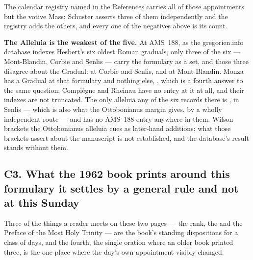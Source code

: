 The calendar registry named in the References carries all of those
appointments but the votive Mass; Schuster asserts three of them independently
and the registry adds the others, and every one of the negatives above is its
count.

\textbf{The Alleluia is the weakest of the five.} At AMS~188, as the
gregorien.info database indexes Hesbert's six oldest Roman graduals, only three
of the six --- Mont-Blandin, Corbie and Senlis --- carry the formulary as a set,
and those three disagree about the Gradual:  at Corbie and
Senlis,  and  at
Mont-Blandin. Monza has a Gradual at that formulary and nothing else,
, which is a fourth answer to the same question;
Compiègne and Rheinau have no entry at it at all, and their indexes are not
truncated. The only alleluia any of the six records there is , in Senlis --- which is also what the Ottobonianus margin
gives, by a wholly independent route --- and  has no AMS~188 entry anywhere in them. Wilson brackets the Ottobonianus alleluia
cues as later-hand additions; what those brackets assert about the manuscript is
not established, and the database's result stands without them.

\subsection*{C3. What the 1962 book prints around this formulary it settles by a general rule and not at this Sunday}

Three of the things a reader meets on these two pages --- the rank, the
 and the Preface of the Most Holy Trinity --- are the book's
standing dispositions for a class of days, and the fourth, the single oration
where an older book printed three, is the one place where the day's own
appointment visibly changed.

